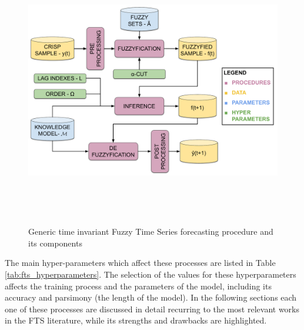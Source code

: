 \begin{figure}
    \centering
    \includegraphics[width=\textwidth,height=12cm]{figures/fts_forecasting.pdf}
    \caption{Generic time invariant Fuzzy Time Series forecasting procedure and its components}
    \label{fig:fts_forecasting}
\end{figure}


The main hyper-parameters which affect these processes are listed in Table \ref{tab:fts_hyperparameters}. The selection of the values for these hyperparameters affects the training process and the parameters of the model, including its accuracy and parsimony (the length of the model).  In the following sections each one of these processes are discussed in detail recurring to the most relevant works in the FTS literature, while its strengths and drawbacks are highlighted.

